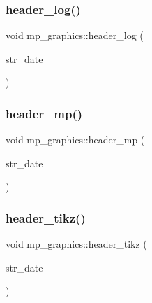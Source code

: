 \subsubsection{\texorpdfstring{header\+\_\+log()}{header\_log()}}
{\footnotesize\ttfamily void mp\+\_\+graphics\+::header\+\_\+log (\begin{DoxyParamCaption}\item[{\mbox{\hyperlink{galois_8h_ab6cc7b4aeb6ea31aba2b3fbfc83ff5e6}{B\+Y\+TE}} $\ast$}]{str\+\_\+date }\end{DoxyParamCaption})}

\mbox{\label{classmp__graphics_ad08252e9be57fd9d484a80a1c3602969}} 
\subsubsection{\texorpdfstring{header\+\_\+mp()}{header\_mp()}}
{\footnotesize\ttfamily void mp\+\_\+graphics\+::header\+\_\+mp (\begin{DoxyParamCaption}\item[{\mbox{\hyperlink{galois_8h_ab6cc7b4aeb6ea31aba2b3fbfc83ff5e6}{B\+Y\+TE}} $\ast$}]{str\+\_\+date }\end{DoxyParamCaption})}

\mbox{\label{classmp__graphics_a89a5fbf0e495443260399c1b6b3bb320}} 
\subsubsection{\texorpdfstring{header\+\_\+tikz()}{header\_tikz()}}
{\footnotesize\ttfamily void mp\+\_\+graphics\+::header\+\_\+tikz (\begin{DoxyParamCaption}\item[{\mbox{\hyperlink{galois_8h_ab6cc7b4aeb6ea31aba2b3fbfc83ff5e6}{B\+Y\+TE}} $\ast$}]{str\+\_\+date }\end{DoxyParamCaption})}

\mbox{\label{classmp__graphics_a48eeaba8be672a2d5eee6b1f428b947e}} 

